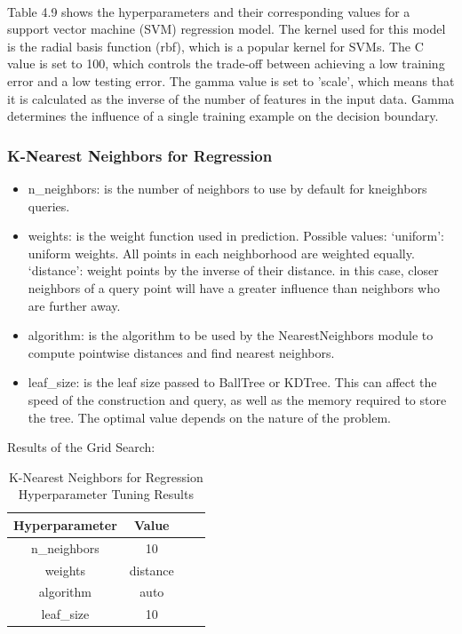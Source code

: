 \documentclass{report}
\begin{document}
\\
Table 4.9 shows the hyperparameters and their corresponding values for a support vector machine (SVM) regression model. The kernel used for this model is the radial basis function (rbf), which is a popular kernel for SVMs. The C value is set to 100, which controls the trade-off between achieving a low training error and a low testing error. The gamma value is set to 'scale', which means that it is calculated as the inverse of the number of features in the input data. Gamma determines the influence of a single training example on the decision boundary. 
\subsubsection{K-Nearest Neighbors for Regression}
\begin{itemize}
    \item n\_neighbors: is the number of neighbors to use by default for kneighbors queries\cite{scikit-learn}. 
    \item weights: is the weight function used in prediction. Possible values: ‘uniform’: uniform weights. All points in each neighborhood are weighted equally. ‘distance’: weight points by the inverse of their distance. in this case, closer neighbors of a query point will have a greater influence than neighbors who are further away\cite{scikit-learn}. 
    \item algorithm: is the algorithm to be used by the NearestNeighbors module to compute pointwise distances and find nearest neighbors.
    \item leaf\_size: is the leaf size passed to BallTree or KDTree. This can affect the speed of the construction and query, as well as the memory required to store the tree. The optimal value depends on the nature of the problem\cite{scikit-learn}. 
\end{itemize}
Results of the Grid Search:
\begin{table}[h]
\centering
\begin{tabular}{|c|c|c|c|}
\hline
\textbf{Hyperparameter} & \textbf{Value} \\ \hline
n\_neighbors & 10 \\ \hline
weights & distance \\ \hline
algorithm & auto \\ \hline
leaf\_size & 10 \\ \hline
\end{tabular}
\caption{K-Nearest Neighbors for Regression Hyperparameter Tuning Results}
\end{table}\\
\end{document}
